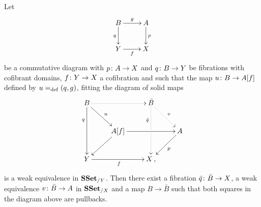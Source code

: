 \documentclass[reqno,10pt,a4paper,oneside,draft]{amsart}
\begin{document}
\begin{proposition}
\label{Prop:Homotopy_ext_prop}
Let 
\[
\xymatrix{
B \ar[r]^g \ar[d]_q & A \ar[d]^p \\
Y \ar[r]_f & X}
\]
be a commutative diagram with $p \colon A \to X$ and $q \colon B \to Y$ be fibrations with cofibrant domains, $f \colon Y \to X$ 
a cofibration and such that the map $u \colon B \to A[f]$ defined by $u =_{\operatorname{def}} (q, g)$, fitting the diagram 
of solid maps
\[ 
\xymatrix{
 B
  \ar@{.>}[rr]
  \ar[dr]^{u}
  \ar[dd]_(.3){q}
&&
  \bar{B}
  \ar@{.>}[dr]^{v}
  \ar@{.>}[dd]_(.3){\bar{q}}|{\hole}
&\\&
  A[f] 
  \ar[rr]
  \ar[dl]
&&
  A
  \ar[dl]^{p}
\\
  Y
  \ar[rr]_{f}
&&
  X \, ,
&
}
\]
is a weak equivalence in $\mathbf{SSet}_{/ Y}$. Then there exist a fibration $\bar{q} \colon \bar{B} \to X$, a weak equivalence $v \colon \bar{B} \to A$ in $\mathbf{SSet}_{/X}$ and a map $B \to \bar{B}$ such that both squares in the diagram above are pullbacks. 
\end{proposition}
\end{document}
